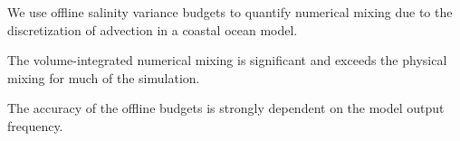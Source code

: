 \documentclass[draft]{agujournal2019}
\begin{document}


\begin{keypoints}
\item We use offline salinity variance budgets to quantify numerical mixing due to the discretization of advection in a coastal ocean model.
\item The volume-integrated numerical mixing is significant and exceeds the physical mixing for much of the simulation.
\item The accuracy of the offline budgets is strongly dependent on the model output frequency.
\end{keypoints}

%
%

%
%

\end{document}
